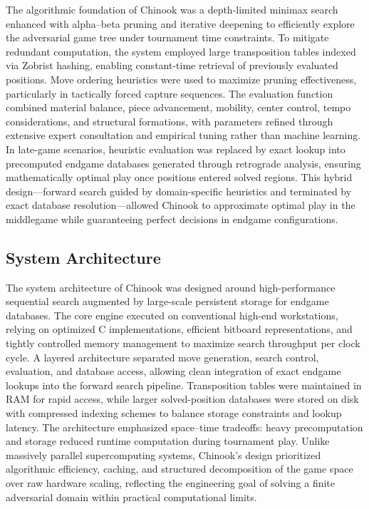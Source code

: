 \documentclass[11pt,a4paper]{report}
\begin{document}
The algorithmic foundation of Chinook was a depth-limited minimax search enhanced with alpha–beta pruning and
iterative deepening to efficiently explore the adversarial game tree under tournament time constraints. To mitigate
redundant computation, the system employed large transposition tables indexed via Zobrist hashing, enabling constant-time
retrieval of previously evaluated positions. Move ordering heuristics were used to maximize pruning effectiveness, particularly
in tactically forced capture sequences. The evaluation function combined material balance, piece advancement, mobility, center control,
tempo considerations, and structural formations, with parameters refined through extensive expert consultation and empirical
tuning rather than machine learning. In late-game scenarios, heuristic evaluation was replaced by exact lookup into precomputed
endgame databases generated through retrograde analysis, ensuring mathematically optimal play once positions entered solved regions.
This hybrid design—forward search guided by domain-specific heuristics and terminated by exact database resolution—allowed Chinook
to approximate optimal play in the middlegame while guaranteeing perfect decisions in endgame configurations.

\subsection{System Architecture}

The system architecture of Chinook was designed around high-performance sequential search augmented by large-scale persistent
storage for endgame databases. The core engine executed on conventional high-end workstations, relying on optimized C implementations,
efficient bitboard representations, and tightly controlled memory management to maximize search throughput per clock cycle. A layered
architecture separated move generation, search control, evaluation, and database access, allowing clean integration of exact endgame
lookups into the forward search pipeline. Transposition tables were maintained in RAM for rapid access, while larger solved-position
databases were stored on disk with compressed indexing schemes to balance storage constraints and lookup latency. The architecture emphasized
space–time tradeoffs: heavy precomputation and storage reduced runtime computation during tournament play. Unlike massively parallel supercomputing
systems, Chinook’s design prioritized algorithmic efficiency, caching, and structured decomposition of the game space over raw hardware scaling,
reflecting the engineering goal of solving a finite adversarial domain within practical computational limits.
\end{document}

